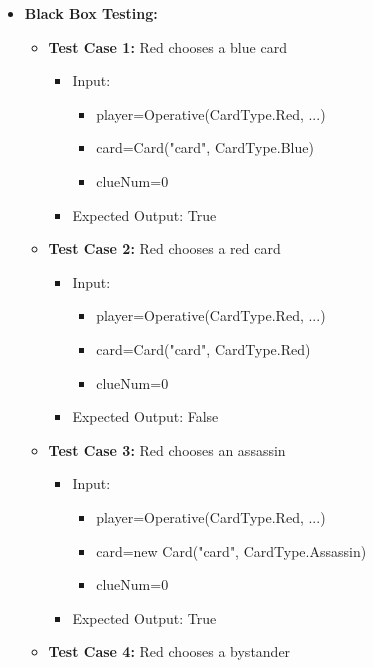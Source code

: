 \documentclass[12pt]{article}
\begin{document}
\begin{itemize}
    \item \textbf{Black Box Testing:}
        \begin{itemize}
        \item \textbf{Test Case 1:} Red chooses a blue card
            \begin{itemize}
            \item Input:
                \begin{itemize}
                    \item player=Operative(CardType.Red, ...)
                    \item card=Card("card", CardType.Blue)
                    \item clueNum=0
                \end{itemize}
            \item Expected Output: True
        \end{itemize}
        \item \textbf{Test Case 2:} Red chooses a red card
            \begin{itemize}
            \item Input:
                \begin{itemize}
                    \item player=Operative(CardType.Red, ...)
                    \item card=Card("card", CardType.Red)
                    \item clueNum=0
                \end{itemize}
            \item Expected Output: False
        \end{itemize}
        \item \textbf{Test Case 3:} Red chooses an assassin
            \begin{itemize}
            \item Input:
            \begin{itemize}
                    \item player=Operative(CardType.Red, ...)
                    \item card=new Card("card", CardType.Assassin)
                    \item clueNum=0
                \end{itemize}
            \item Expected Output: True
        \end{itemize}
        \item \textbf{Test Case 4:} Red chooses a bystander

\end{itemize}
\end{itemize}
\end{document}
